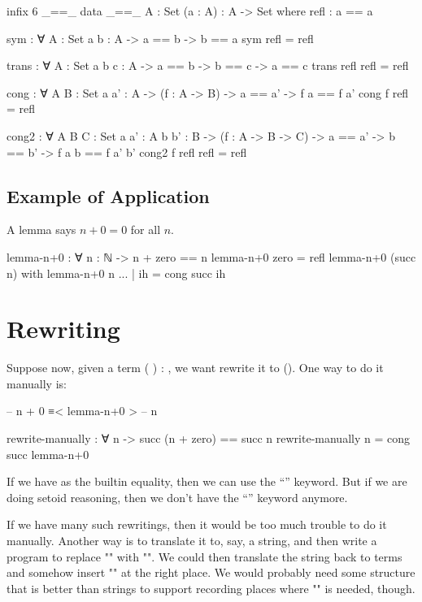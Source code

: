 \documentclass{article}
\begin{document}
\begin{code}
infix 6 _==_
data _==_ {A : Set} (a : A) : A -> Set where
  refl : a == a

sym : ∀ {A : Set} {a b : A} -> a == b -> b == a
sym refl = refl

trans : ∀ {A : Set} {a b c : A} -> a == b -> b == c -> a == c
trans refl refl = refl

cong : ∀ {A B : Set} {a a' : A} ->
       (f : A -> B) -> a == a' -> f a == f a'
cong f refl = refl

cong2 : ∀ {A B C : Set} {a a' : A} {b b' : B} ->
        (f : A -> B -> C) -> a == a' -> b == b' -> f a b == f a' b'
cong2 f refl refl = refl
\end{code}

\subsection{Example of Application}

A lemma says \(n + 0 = 0\) for all \(n\).

\begin{code}
lemma-n+0 : ∀ {n : ℕ} -> n + zero == n
lemma-n+0 {zero} = refl
lemma-n+0 {(succ n)} with lemma-n+0 {n}
... | ih = cong succ ih
\end{code}

\section{Rewriting}

Suppose now, given a term \AgdaSymbol( \AgdaOperator{\AgdaInductiveConstructor{+}} \AgdaSymbol) \AgdaSymbol: , we want rewrite it to \AgdaSymbol(\AgdaSymbol). One way to do it manually is:

\begin{code}
--  n + 0 ≡< lemma-n+0 >
--  n
\end{code}

\begin{code}
rewrite-manually : ∀ n -> succ (n + zero) == succ n
rewrite-manually n = cong succ lemma-n+0
\end{code}

If we have \AgdaFunction{\AgdaUnderscore{}==\AgdaUnderscore{}} as the builtin equality, then we can use the ``'' keyword. But if we are doing setoid reasoning, then we don't have the ``'' keyword anymore.

If we have many such rewritings, then it would be too much trouble to do it manually. Another way is to translate it to, say, a string, and then write a program to replace "" with "". We could then translate the string back to terms and somehow insert
"" at the right place. We would probably need some structure that is better than strings to support recording places where "" is needed, though.
\end{document}
